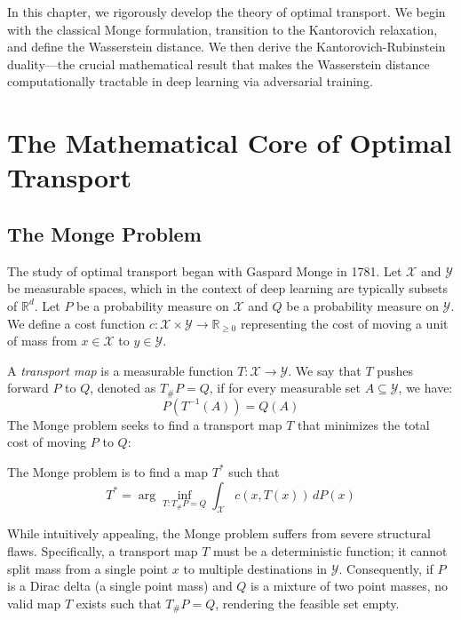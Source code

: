 In this chapter, we rigorously develop the theory of optimal transport. We begin with the classical Monge formulation, transition to the Kantorovich relaxation, and define the Wasserstein distance. We then derive the Kantorovich-Rubinstein duality—the crucial mathematical result that makes the Wasserstein distance computationally tractable in deep learning via adversarial training.

\section{The Mathematical Core of Optimal Transport}

\subsection{The Monge Problem}
The study of optimal transport began with Gaspard Monge in 1781. Let $\mathcal{X}$ and $\mathcal{Y}$ be measurable spaces, which in the context of deep learning are typically subsets of $\mathbb{R}^d$. Let $P$ be a probability measure on $\mathcal{X}$ and $Q$ be a probability measure on $\mathcal{Y}$. We define a cost function $c: \mathcal{X} \times \mathcal{Y} \to \mathbb{R}_{\geq 0}$ representing the cost of moving a unit of mass from $x \in \mathcal{X}$ to $y \in \mathcal{Y}$.

A \emph{transport map} is a measurable function $T: \mathcal{X} \to \mathcal{Y}$. We say that $T$ pushes forward $P$ to $Q$, denoted as $T_{\#}P = Q$, if for every measurable set $A \subseteq \mathcal{Y}$, we have:
\[
P(T^{-1}(A)) = Q(A)
\]
The Monge problem seeks to find a transport map $T$ that minimizes the total cost of moving $P$ to $Q$:
\begin{definition}
\label{def:monge}
The Monge problem is to find a map $T^*$ such that
\[
T^* = \arg\inf_{T: T_{\#}P = Q} \int_{\mathcal{X}} c(x, T(x)) \, dP(x)
\]
\end{definition}

While intuitively appealing, the Monge problem suffers from severe structural flaws. Specifically, a transport map $T$ must be a deterministic function; it cannot split mass from a single point $x$ to multiple destinations in $\mathcal{Y}$. Consequently, if $P$ is a Dirac delta (a single point mass) and $Q$ is a mixture of two point masses, no valid map $T$ exists such that $T_{\#}P = Q$, rendering the feasible set empty.

